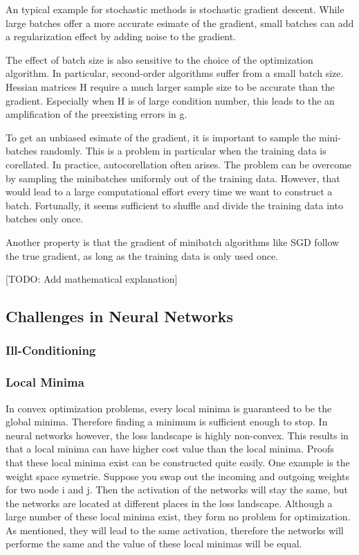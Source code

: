 An typical example for stochastic methods is stochastic gradient descent. While
large batches offer a more accurate esimate of the gradient, small batches can
add a regularization effect by adding noise to the gradient.

The effect of batch size is also sensitive to the choice of the optimization
algorithm. In particular, second-order algorithms suffer from a small batch
size. Hessian matrices H require a much larger sample size to be accurate than
the gradient. Especially when H is of large condition number, this leads to the
an amplification of the preexisting errors in g.

To get an unbiased esimate of the gradient, it is important to sample the
mini-batches randomly. This is a problem in particular when the training data is
corellated. In practice, autocorellation often arises. The problem can be
overcome by sampling the minibatches uniformly out of the training data.
However, that would lead to a large computational effort every time we want to
construct a batch. Fortunally, it seems sufficient to shuffle and divide the
training data into batches only once.

Another property is that the gradient of minibatch algorithms like SGD follow
the true gradient, as long as the training data is only used once.

[TODO: Add mathematical explanation]

\subsection{Challenges in Neural Networks}
\subsubsection{Ill-Conditioning}

\subsubsection{Local Minima}
In convex optimization problems, every local minima is guaranteed to be the
global minima. Therefore finding a minimum is sufficient enough to stop. In
neural networks however, the loss landscape is highly non-convex. This results
in that a local minima can have higher cost value than the local minima. Proofs
that these local minima exist can be constructed quite easily. One example is
the weight space symetrie. Suppose you swap out the incoming and outgoing
weights for two node i and j. Then the activation of the networks will stay the
same, but the networks are located at different places in the loss landscape.
Although a large number of these local minima exist, they form no problem for
optimization. As mentioned, they will lead to the same activation, therefore the
networks will performe the same and the value of these local minimas will be
equal.

